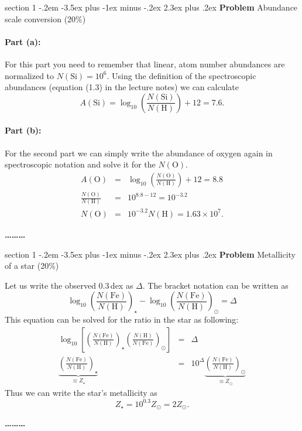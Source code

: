 \documentclass[letterpaper,12pt,twoside=false,DIV=13]{scrartcl}
\makeatletter
\newenvironment{problem}{\@startsection
    {section}
    {1}
    {-.2em}
    {-3.5ex plus -1ex minus -.2ex}
    {2.3ex plus .2ex}
    {
        \pagebreak[3] %
        \noindent\sffamily\bfseries Problem
    }
}
{
    \begin{center}\large\bfseries\ldots\ldots\ldots\end{center}
}
\makeatother
\begin{document}
\begin{problem}{Abundance scale conversion (20\%)}

\paragraph{Part (a):} For this part you need to remember that linear, atom number abundances are normalized to $N(\mathrm{Si}) = 10^6$. Using the definition of the spectroscopic abundances (equation (1.3) in the lecture notes) we can calculate
\begin{equation}
    A(\mathrm{Si}) = \log_{10} \left(\frac{N(\mathrm{Si})}{N(\mathrm{H})}\right) + 12 = 7.6.
\end{equation}

\paragraph{Part (b):} For the second part we can simply write the abundance of oxygen again in spectroscopic notation and solve it for the $N(\mathrm{O})$.
\begin{eqnarray}
    A(\mathrm{O}) &=& \log_{10} \left(\frac{N(\mathrm{O})}{N(\mathrm{H})}\right) + 12 = 8.8 \\
    \frac{N(\mathrm{O})}{N(\mathrm{H})} &=& 10^{8.8-12} = 10^{-3.2} \\
    N(\mathrm{O}) &=& 10^{-3.2} N(\mathrm{H})  = 1.63 \times 10^7.
\end{eqnarray}

\end{problem}

\begin{problem}{Metallicity of a star (20\%)}\label{prob:metallicity}

Let us write the observed 0.3\,dex as $\Delta$. The bracket notation can be written as
\begin{equation}
    \log_{10} \left(\frac{N(\mathrm{Fe})}{N(\mathrm{H})}\right)_\star - \log_{10} \left(\frac{N(\mathrm{Fe})}{N(\mathrm{H})}\right)_\odot = \Delta
\end{equation}
This equation can be solved for the ratio in the star as following:
\begin{eqnarray}
    \log_{10}\left[\left(\frac{N(\mathrm{Fe})}{N(\mathrm{H})}\right)_\star \left(\frac{N(\mathrm{H})}{N(\mathrm{Fe})}\right)_\odot\right] &=& \Delta \\
    \underbrace{\left(\frac{N(\mathrm{Fe})}{N(\mathrm{H})}\right)_\star}_{\equiv Z_\star} &=& 10^\Delta \underbrace{\left(\frac{N(\mathrm{Fe})}{N(\mathrm{H})}\right)_\odot}_{\equiv Z_\odot} \label{eqn:metallicity_part_solved} 
\end{eqnarray}
Thus we can write the star's metallicity as
\begin{equation}
    Z_\star = 10^{0.3} Z_\odot = 2Z_\odot.
\end{equation}

\end{problem}
\end{document}
